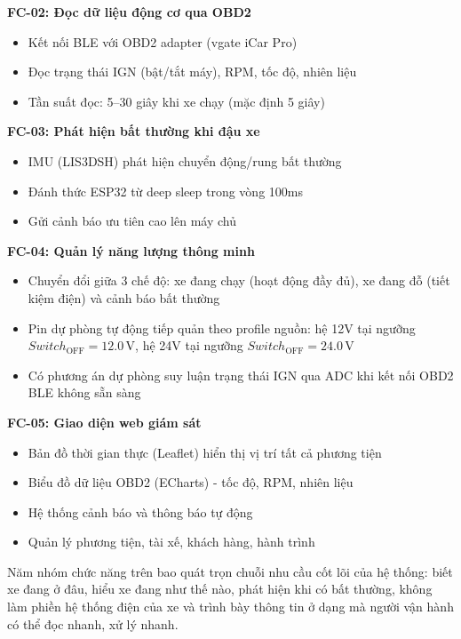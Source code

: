 \documentclass[a4paper]{extarticle}
\providecommand{\tightlist}{%
  \setlength{\itemsep}{0pt}\setlength{\parskip}{0pt}}
\begin{document}
\textbf{FC-02: Đọc dữ liệu động cơ qua OBD2}

\begin{itemize}
\tightlist
\item
  Kết nối BLE với OBD2 adapter (vgate iCar Pro)
\item
  Đọc trạng thái IGN (bật/tắt máy), RPM, tốc độ, nhiên liệu
\item
  Tần suất đọc: 5--30 giây khi xe chạy (mặc định 5 giây)
\end{itemize}

\textbf{FC-03: Phát hiện bất thường khi đậu xe}

\begin{itemize}
\tightlist
\item
  IMU (LIS3DSH) phát hiện chuyển động/rung bất thường
\item
  Đánh thức ESP32 từ deep sleep trong vòng 100ms
\item
  Gửi cảnh báo ưu tiên cao lên máy chủ
\end{itemize}

\textbf{FC-04: Quản lý năng lượng thông minh}

\begin{itemize}
\tightlist
\item
  Chuyển đổi giữa 3 chế độ: xe đang chạy (hoạt động đầy đủ), xe đang đỗ
  (tiết kiệm điện) và cảnh báo bất thường
\item
  Pin dự phòng tự động tiếp quản theo profile nguồn: hệ 12V tại ngưỡng
  \(Switch_{\mathrm{OFF}} = 12.0\,\mathrm{V}\), hệ 24V tại ngưỡng
  \(Switch_{\mathrm{OFF}} = 24.0\,\mathrm{V}\)
\item
  Có phương án dự phòng suy luận trạng thái IGN qua ADC khi kết nối OBD2
  BLE không sẵn sàng
\end{itemize}

\textbf{FC-05: Giao diện web giám sát}

\begin{itemize}
\tightlist
\item
  Bản đồ thời gian thực (Leaflet) hiển thị vị trí tất cả phương tiện
\item
  Biểu đồ dữ liệu OBD2 (ECharts) - tốc độ, RPM, nhiên liệu
\item
  Hệ thống cảnh báo và thông báo tự động
\item
  Quản lý phương tiện, tài xế, khách hàng, hành trình
\end{itemize}

Năm nhóm chức năng trên bao quát trọn chuỗi nhu cầu cốt lõi của hệ
thống: biết xe đang ở đâu, hiểu xe đang như thế nào, phát hiện khi có
bất thường, không làm phiền hệ thống điện của xe và trình bày thông tin ở
dạng mà người vận hành có thể đọc nhanh, xử lý nhanh.
\end{document}
